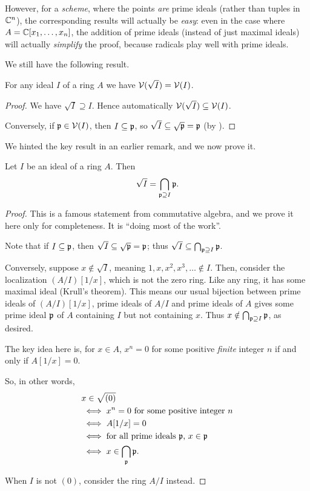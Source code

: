 However, for a \emph{scheme}, where the points \emph{are} prime ideals
(rather than tuples in $\mathbb C^n$),
the corresponding results will actually be \emph{easy}:
even in the case where $A = \mathbb C[x_1, \dots, x_n]$,
the addition of prime ideals (instead of just maximal ideals)
will actually \emph{simplify} the proof,
because radicals play well with prime ideals.

We still have the following result.
\begin{proposition}
	[$\VV(\sqrt I) = \VV(I)$]
	For any ideal $I$ of a ring $A$
	we have $\VV(\sqrt I) = \VV(I)$.
\end{proposition}
\begin{proof}
	We have $\sqrt I \supseteq I$.
	Hence automatically $\mathcal V(\sqrt I) \subseteq \mathcal V(I)$.

	Conversely, if $\mathfrak p \in \mathcal V(I)$, then $I \subseteq \mathfrak p$,
	so $\sqrt I \subseteq \sqrt{\mathfrak p} = \mathfrak p$
	(by ).
\end{proof}

We hinted the key result in an earlier remark,
and we now prove it.
\begin{theorem}
	\label{thm:radical_intersect_prime}
	Let $I$ be an ideal of a ring $A$.
	Then \[ \sqrt I = \bigcap_{\mathfrak p \supseteq I} \mathfrak p. \]
\end{theorem}
\begin{proof}
	This is a famous statement from commutative algebra,
	and we prove it here only for completeness.
	It is ``doing most of the work''.

	Note that if $I \subseteq \mathfrak p$,
	then $\sqrt I \subseteq \sqrt{\mathfrak p} = \mathfrak p$;
	thus $\sqrt I \subseteq \bigcap_{\mathfrak p \supseteq I} \mathfrak p$.

	Conversely, suppose $x \notin \sqrt I$,
	meaning $1, x, x^2, x^3, \dots \notin I$.
	Then, consider the localization $(A/I)[1/x]$, which is not the zero ring.
	Like any ring, it has some maximal ideal (Krull's theorem).
	This means our usual bijection between prime ideals of $(A/I)[1/x]$,
	prime ideals of $A/I$ and prime ideals of $A$
	gives some prime ideal $\mathfrak p$ of $A$ containing $I$ but not containing $x$.
	Thus $x \notin \bigcap_{\mathfrak p \supseteq I} \mathfrak p$,
	as desired.

	The key idea here is, for $x \in A$,
	$x^n = 0$ for some positive \emph{finite} integer $n$ if and only if $A[1/x] = 0$.

	So, in other words,
	\begin{align*}
		& x \in \sqrt{(0)} \\
		& \iff \text{$x^n = 0$ for some positive integer $n$} \\
		& \iff A[1/x] = 0 \\
		& \iff \text{for all prime ideals $\mathfrak p$, $x \in \mathfrak p$} \\
		& \iff x \in \bigcap_\mathfrak p \mathfrak p.
	\end{align*}

	When $I$ is not $(0)$, consider the ring $A/I$ instead.
\end{proof}

